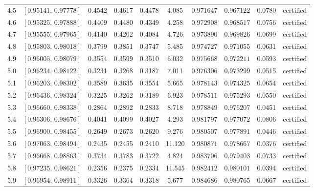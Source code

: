 {\begin{longtable}{@{}lccccccccl@{}}
\rule[-3pt]{0pt}{11.5pt} 4.5 & $[0.95141,\,0.97778]$ & 0.4542 & 0.4617 & 0.4478 & 4.085 & $0.971647$ & $0.967122$ & 0.0780 & certified \\
\rule[-3pt]{0pt}{11.5pt} 4.6 & $[0.95325,\,0.97888]$ & 0.4409 & 0.4480 & 0.4349 & 4.258 & $0.972908$ & $0.968517$ & 0.0756 & certified \\
\rule[-3pt]{0pt}{11.5pt} 4.7 & $[0.95555,\,0.97965]$ & 0.4140 & 0.4202 & 0.4084 & 4.726 & $0.973890$ & $0.969826$ & 0.0699 & certified \\
\rule[-3pt]{0pt}{11.5pt} 4.8 & $[0.95803,\,0.98018]$ & 0.3799 & 0.3851 & 0.3747 & 5.485 & $0.974727$ & $0.971055$ & 0.0631 & certified \\
\rule[-3pt]{0pt}{11.5pt} 4.9 & $[0.96005,\,0.98079]$ & 0.3554 & 0.3599 & 0.3510 & 6.032 & $0.975668$ & $0.972211$ & 0.0593 & certified \\
\rule[-3pt]{0pt}{11.5pt} 5.0 & $[0.96234,\,0.98122]$ & 0.3231 & 0.3268 & 0.3187 & 7.011 & $0.976306$ & $0.973299$ & 0.0515 & certified \\
\rule[-3pt]{0pt}{11.5pt} 5.1 & $[0.96203,\,0.98302]$ & 0.3589 & 0.3635 & 0.3554 & 5.665 & $0.978143$ & $0.974325$ & 0.0654 & certified \\
\rule[-3pt]{0pt}{11.5pt} 5.2 & $[0.96436,\,0.98324]$ & 0.3225 & 0.3262 & 0.3189 & 6.923 & $0.978511$ & $0.975293$ & 0.0550 & certified \\
\rule[-3pt]{0pt}{11.5pt} 5.3 & $[0.96660,\,0.98338]$ & 0.2864 & 0.2892 & 0.2833 & 8.718 & $0.978849$ & $0.976207$ & 0.0451 & certified \\
\rule[-3pt]{0pt}{11.5pt} 5.4 & $[0.96306,\,0.98676]$ & 0.4041 & 0.4099 & 0.4027 & 4.293 & $0.981797$ & $0.977072$ & 0.0806 & certified \\
\rule[-3pt]{0pt}{11.5pt} 5.5 & $[0.96900,\,0.98455]$ & 0.2649 & 0.2673 & 0.2620 & 9.276 & $0.980507$ & $0.977891$ & 0.0446 & certified \\
\rule[-3pt]{0pt}{11.5pt} 5.6 & $[0.97063,\,0.98494]$ & 0.2435 & 0.2455 & 0.2410 & 11.120 & $0.980871$ & $0.978667$ & 0.0376 & certified \\
\rule[-3pt]{0pt}{11.5pt} 5.7 & $[0.96668,\,0.98863]$ & 0.3734 & 0.3783 & 0.3722 & 4.824 & $0.983706$ & $0.979403$ & 0.0733 & certified \\
\rule[-3pt]{0pt}{11.5pt} 5.8 & $[0.97235,\,0.98621]$ & 0.2356 & 0.2375 & 0.2334 & 11.545 & $0.982412$ & $0.980101$ & 0.0394 & certified \\
\rule[-3pt]{0pt}{11.5pt} 5.9 & $[0.96954,\,0.98911]$ & 0.3326 & 0.3364 & 0.3318 & 5.677 & $0.984686$ & $0.980765$ & 0.0667 & certified \\

\end{longtable}}
